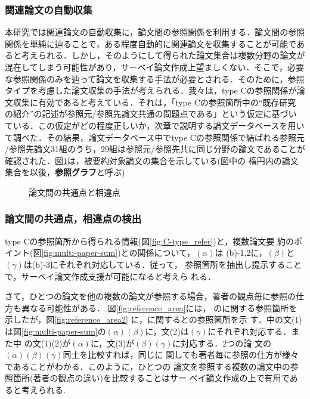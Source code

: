 \subsubsection{関連論文の自動収集}

本研究では関連論文の自動収集に，論文間の参照関係を利用する．論文間の参照
関係を単純に辿ることで，ある程度自動的に関連論文を収集することが可能であ
ると考えられる．しかし，そのようにして得られた論文集合は複数分野の論文が
混在してしまう可能性があり，サーベイ論文作成上望ましくない．そこで，必要
な参照関係のみを辿って論文を収集する手法が必要とされる．そのために，参照
タイプを考慮した論文収集の手法が考えられる．我々は，type Cの参照関係が論
文収集に有効であると考えている．それは，「type Cの参照箇所中の``既存研究
の紹介''の記述が参照元/参照先論文共通の問題点である」という仮定に基づい
ている．この仮定がどの程度正しいか，次章で説明する論文データベースを用い
て調べた．その結果，論文データベース中でtype Cの参照関係で結ばれる参照元
/参照先論文31組のうち，29組は参照元/参照先共に同じ分野の論文であることが
確認された．図\ref{fig:graph}は，被要約対象論文の集合を示している(図中の
楕円内の論文集合を以後，{\bf 参照グラフ}と呼ぶ)

\begin{figure}[t]
\centering
{}
\caption{論文間の共通点と相違点\label{fig:graph}}
\end{figure}

\subsubsection{論文間の共通点，相違点の検出}

type Cの参照箇所から得られる情報(図\ref{fig:C-type_refer})と，複数論文要
約のポイント(図\ref{fig:multi-paper-sum})との関係について，$(\alpha )$は
(b)-1,2に，$(\beta )$と$(\gamma )$は(b)-3にそれぞれ対応している．従って，
参照箇所を抽出し提示することで，サーベイ論文作成支援が可能になると考えら
れる．

さて，ひとつの論文を他の複数の論文が参照する場合，著者の観点毎に参照の仕
方も異なる可能性がある． 図\ref{fig:reference_area}には，\cite{Bond96a}
の\cite{Murata93}に関する参照箇所を示したが，図\ref{fig:reference_area2}
に，\cite{Murata93}に関する\cite{Bond94}と\cite{Takeda94}の参照箇所を示
す．\cite{Bond96a}中の文(1)は図\ref{fig:multi-paper-sum}の$(\alpha )
(\beta )$に，文(2)は$(\gamma )$にそれぞれ対応する．また\cite{Takeda94}中
の文(1)(2)が$(\alpha )$に，文(3)が$(\beta )(\gamma )$に対応する．2つの論
文の$(\alpha )(\beta )(\gamma )$同士を比較すれば，同じ\cite{Murata93}に
関しても著者毎に参照の仕方が様々であることがわかる．このように，ひとつの
論文を参照する複数の論文中の参照箇所(著者の観点の違い)を比較することはサー
ベイ論文作成の上で有用であると考えられる.

